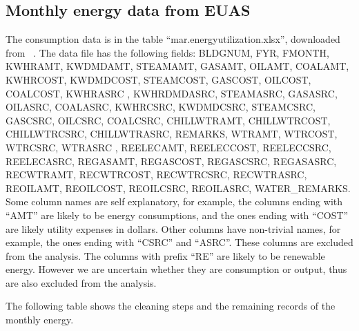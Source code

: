 \documentclass[12pt]{article}
\begin{document}
\subsection{Monthly energy data from EUAS} The consumption data is in the table
``mar.energyutilization.xlsx'', downloaded from ~\cite{euas2019}. The data file
has the following fields: BLDGNUM, FYR, FMONTH, KWHRAMT, KWDMDAMT, STEAMAMT,
GASAMT, OILAMT, COALAMT, KWHRCOST, KWDMDCOST, STEAMCOST, GASCOST, OILCOST,
COALCOST, KWHRASRC , KWHRDMDASRC, STEAMASRC, GASASRC, OILASRC, COALASRC,
KWHRCSRC, KWDMDCSRC, STEAMCSRC, GASCSRC, OILCSRC, COALCSRC, CHILLWTRAMT,
CHILLWTRCOST, CHILLWTRCSRC, CHILLWTRASRC, REMARKS, WTRAMT, WTRCOST, WTRCSRC,
WTRASRC , REELECAMT, REELECCOST, REELECCSRC, REELECASRC, REGASAMT, REGASCOST,
REGASCSRC, REGASASRC, RECWTRAMT, RECWTRCOST, RECWTRCSRC, RECWTRASRC, REOILAMT,
REOILCOST, REOILCSRC, REOILASRC, WATER\_REMARKS. Some column names are self
explanatory, for example, the columns ending with ``AMT'' are likely to be
energy consumptions, and the ones ending with ``COST'' are likely utility
expenses in dollars. Other columns have non-trivial names, for example, the ones
ending with ``CSRC'' and ``ASRC''. These columns are excluded from the analysis.
The columns with prefix ``RE'' are likely to be renewable energy. However we are
uncertain whether they are consumption or output, thus are also excluded from
the analysis.

The following table shows the cleaning steps and the remaining records of the
monthly energy.
\end{document}
